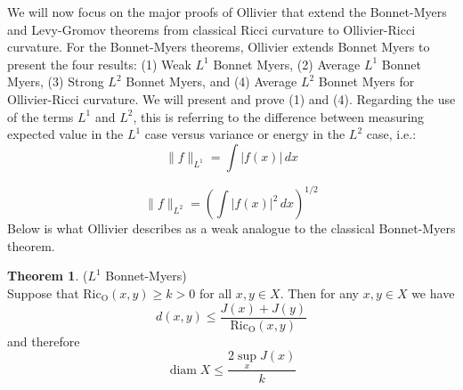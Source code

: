 \documentclass{Dissertate}
\theoremstyle{definition}
\newtheorem{theorem}{Theorem}[section]
\theoremstyle{definition} %
\theoremstyle{definition}
\begin{document}
We will now focus on the major proofs of Ollivier that extend the Bonnet-Myers and Levy-Gromov theorems from classical Ricci curvature to Ollivier-Ricci curvature. For the Bonnet-Myers theorems, Ollivier extends Bonnet Myers to present the four results: (1) Weak $L^1$ Bonnet Myers, (2) Average $L^1$ Bonnet Myers, (3) Strong $L^2$ Bonnet Myers, and (4) Average $L^2$ Bonnet Myers for Ollivier-Ricci curvature. We will present and prove (1) and (4). Regarding the use of the terms $L^1$ and $L^2$, this is referring to the difference between measuring expected value in the $L^1$ case versus variance or energy in the $L^2$ case, i.e.:
\[
\|f\|_{L^1} = \int |f(x)| \, dx
\]
\[
\]

\[
\|f\|_{L^2} = \left( \int |f(x)|^2 \, dx \right)^{1/2}
\]
Below is what Ollivier describes as a weak analogue to the classical Bonnet-Myers theorem.
\begin{theorem} \label{thm: L1-bonnetmyers}($L^1$ Bonnet-Myers) \\ Suppose that $\operatorname{Ric_O}(x, y) \geq k >0$ for all $x, y \in X$. Then for any $x, y \in X$ we have
$$
d(x, y) \leq  \frac{J(x)+J(y)}{\operatorname{Ric_O}(x, y)}
$$
and therefore
$$\operatorname{diam} X \leq \frac{2 \sup _x J(x)}{k}
$$
\end{theorem}
\end{document}

